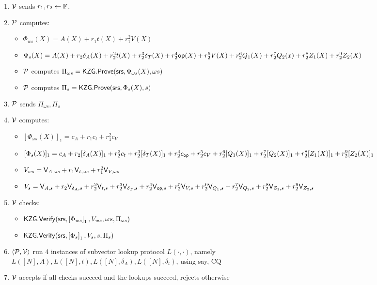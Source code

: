 \begin{figure}[htbp]
\begin{mdframed}
{\begin{enumerate}[leftmargin=1em, label=\arabic*]
\begin{itemize}
            \end{itemize}
            \item $\verifier$ sends $r_1, r_2\gets\F$.
            \item $\prover$ computes:
            \begin{itemize}
                \item $\Phi_{ws}(X)= A(X)+r_1 t(X) +r_1^2 V(X)$
                \item $\Phi_s(X)=A(X)+r_2 \delta_A(X)+r_2^2 t(X)+ r_2^3 \delta_T(X)+r_2^4 \op(X) +r_2^5 V(X)+r_2^6 Q_1(X)+ r_2^7 Q_2(x)+r_2^8 Z_1(X)+r_2^9 Z_2(X)$
                \item $\prover$ computes $\Pi_{\omega s} = \KZGopen(\srs, \Phi_{\omega s}(X), \omega s)$
                \item $\prover$ computes $\Pi_{s} = \KZGopen(\srs, \Phi_{s}(X),s)$




            \end{itemize}
            \item $\prover$ sends $\Pi_{\omega s}, \Pi_{s}$
            \item $\verifier$ computes:
            \begin{itemize}
                \item $[\Phi_{\omega s}(X)]_1= c_A +r_1 c_t + r_1^2 c_V$
                \item $[\Phi_{s}(X)]_1= c_A +r_2 [\delta_A(X)]_1 + r_2^2 c_t +r_2^3 [\delta_T(X)]_1 +r_2^4 c_{\op} +r_2^5 c_V +r_2^6 [Q_1(X)]_1 +r_2^7 [Q_2(X)]_1 +r_2^8 [Z_1(X)]_1 + r_2^9 [Z_2(X)]_1 $
                \item $V_{ws}= \val{\omega s}{A}+r_1 \val{\omega s}{t}+ r_1^2 \val{\omega s}{V}$
                \item $V_s=\val{s}{A}+r_2 \val{s}{\delta_A}+r_2^2 \val{s}{t}+r_2^3 \val{s}{\delta_T}+r_2^4 \val{s}{\op} +r_2^5 \val{s}{V} +r_2^6 \val{s}{Q_1} +r_2^7 \val{s}{Q_2}+r_2^8 \val{s}{Z_1} +r_2^9 \val{s}{Z_2}$
            \end{itemize}
            \item $\verifier$ checks:
            \begin{itemize}
                \item $\KZGverify(\srs, \gone{\Phi_{ws}}, V_{ws}, \omega s, \Pi_{\omega s})$
                \item $\KZGverify(\srs, \gone{\Phi_{s}}, V_{s}, s, \Pi_{s})$
            \end{itemize}

            \item $\left<\prover, \verifier\right>$ run 4 instances of subvector lookup protocol $L(\cdot, \cdot)$, namely $L([N], A), L([N], t), L([N], \delta_A), L([N], \delta_t)$, using say, CQ
            \item $\verifier$ accepts if all checks succeed and the lookups succeed, rejects otherwise
        \end{enumerate}
    }
    \end{mdframed}


\end{figure}
